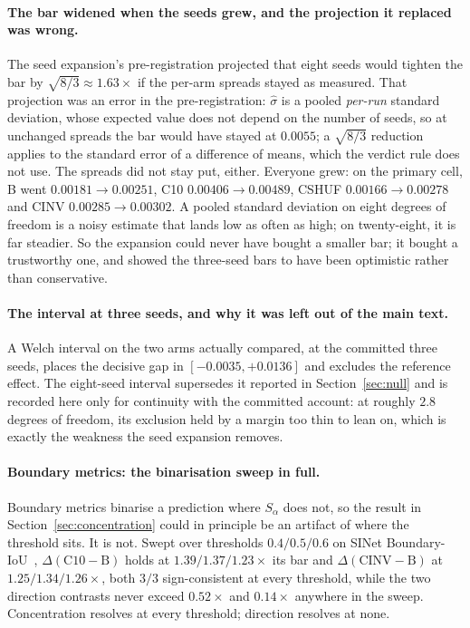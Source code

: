 \documentclass{article}
\begin{document}
\paragraph{The bar widened when the seeds grew, and the projection it replaced was wrong.} The seed
expansion's pre-registration projected that eight seeds would tighten the bar by
$\sqrt{8/3} \approx 1.63\times$ if the per-arm spreads stayed as measured. That projection was an
error in the pre-registration: $\hat{\sigma}$ is a pooled \emph{per-run} standard deviation, whose
expected value does not depend on the number of seeds, so at unchanged spreads the bar would have
stayed at $0.0055$; a $\sqrt{8/3}$ reduction applies to the standard error of a difference of means,
which the verdict rule does not use. The spreads did not stay put, either. Everyone grew: on the primary cell, B went $0.00181 \rightarrow 0.00251$, C10 $0.00406 \rightarrow 0.00489$, CSHUF
$0.00166 \rightarrow 0.00278$ and CINV $0.00285 \rightarrow 0.00302$. A pooled standard deviation
on eight degrees of freedom is a noisy estimate that lands low as often as high; on twenty-eight, it
is far steadier. So the expansion could never have bought a smaller bar; it bought a trustworthy
one, and showed the three-seed bars to have been optimistic rather than conservative.



\paragraph{The interval at three seeds, and why it was left out of the main text.} A Welch interval on the two
arms actually compared, at the committed three seeds, places the decisive gap in
$[-0.0035, +0.0136]$ and excludes the reference effect. The eight-seed interval supersedes it
reported in Section~\ref{sec:null} and is recorded here only for continuity with the committed
account: at roughly $2.8$ degrees of freedom, its exclusion held by a margin too thin to lean on,
which is exactly the weakness the seed expansion removes.

\paragraph{Boundary metrics: the binarisation sweep in full.} Boundary metrics binarise a
prediction where $S_\alpha$ does not, so the result in Section~\ref{sec:concentration} could in principle be an artifact of where the threshold sits. It is not. Swept over thresholds
$0.4 / 0.5 / 0.6$ on SINet Boundary-IoU~\citep{cheng2021boundary}, $\Delta(\mathrm{C10}-\mathrm{B})$ holds at
$1.39 / 1.37 / 1.23 \times$ its bar and $\Delta(\mathrm{CINV}-\mathrm{B})$ at
$1.25 / 1.34 / 1.26 \times$, both $3/3$ sign-consistent at every threshold, while the two direction
contrasts never exceed $0.52\times$ and $0.14\times$ anywhere in the sweep. Concentration resolves
at every threshold; direction resolves at none.
\end{document}
